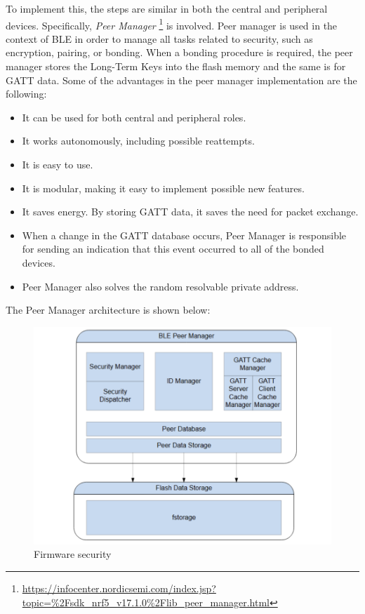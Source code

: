\documentclass{Configuration_Files/PoliMi3i_thesis}
\begin{document}
To implement this, the steps are similar in both the central and peripheral devices. Specifically, \textit{Peer Manager} \footnote{\url{https://infocenter.nordicsemi.com/index.jsp?topic=\%2Fsdk_nrf5_v17.1.0\%2Flib_peer_manager.html}} is involved. Peer manager is used in the context of BLE in order to manage all tasks related to security, such as encryption, pairing, or bonding. When a bonding procedure is required, the peer manager stores the Long-Term Keys into the flash memory and the same is for GATT data. Some of the advantages in the peer manager implementation are the following:

\begin{itemize}
    \item It can be used for both central and peripheral roles.
    \item It works autonomously, including possible reattempts.
    \item It is easy to use.
    \item It is modular, making it easy to implement possible new features.
    \item It saves energy. By storing GATT data, it saves the need for packet exchange.
    \item When a change in the GATT database occurs, Peer Manager is responsible for sending an indication that this event occurred to all of the bonded devices.
    \item Peer Manager also solves the random resolvable private address.
\end{itemize}

The Peer Manager architecture is shown below:

\begin{figure}[h]
    \centering
    \includegraphics[scale=0.3]{Firmware_security/Screenshot 2024-07-22 at 22.33.12.png}
    \caption{Firmware security}
    \label{firm_sec_1}
\end{figure}
\end{document}
